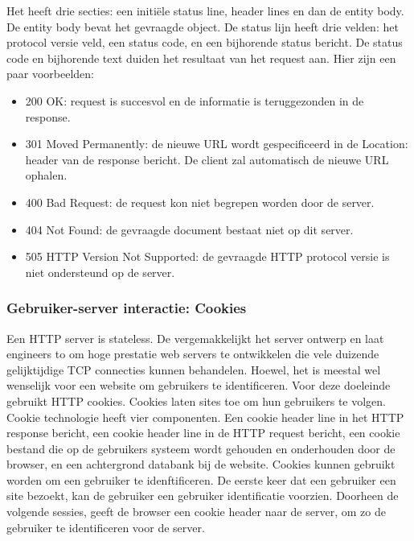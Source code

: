 
Het heeft drie secties: een initiële status line, header lines en dan de entity body. De entity body bevat het gevraagde object. De status lijn heeft drie velden: het protocol versie veld, een status code, en een bijhorende status bericht.
De status code en bijhorende text duiden het resultaat van het request aan. Hier zijn een paar voorbeelden:
\begin{itemize}
   

 \item 200 OK: request is succesvol en de informatie is teruggezonden in de response.
 \item 301 Moved Permanently: de nieuwe URL wordt gespecificeerd in de Location: header van de response bericht. De client zal automatisch de nieuwe URL ophalen.
 \item 400 Bad Request: de request kon niet begrepen worden door de server.
 \item 404 Not Found: de gevraagde document bestaat niet op dit server.
 \item 505 HTTP Version Not Supported: de gevraagde HTTP protocol versie is niet ondersteund op de server.
\end{itemize}

\clearpage

\subsubsection{Gebruiker-server interactie: Cookies}

Een HTTP server is stateless. De vergemakkelijkt het server ontwerp en laat engineers to om hoge prestatie web servers te ontwikkelen die vele duizende gelijktijdige TCP connecties kunnen behandelen. Hoewel, het is meestal wel wenselijk voor een website om gebruikers te identificeren. Voor deze doeleinde gebruikt HTTP cookies. Cookies laten sites toe om hun gebruikers te volgen.
Cookie technologie heeft vier componenten. Een cookie header line in het HTTP response bericht, een cookie header line in de HTTP request bericht, een cookie bestand die op de gebruikers systeem wordt gehouden en onderhouden door de browser, en een achtergrond databank bij de website.
Cookies kunnen gebruikt worden om een gebruiker te idenftificeren. De eerste keer dat een gebruiker een site bezoekt, kan de gebruiker een gebruiker identificatie voorzien. Doorheen de volgende sessies, geeft de browser een cookie header naar de server, om zo de gebruiker te identificeren voor de server.

